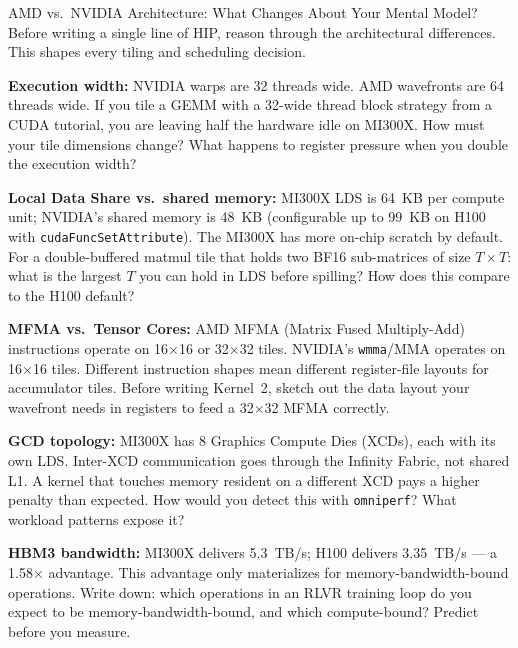 \begin{thinkfirst}{AMD vs.\ NVIDIA Architecture: What Changes About Your Mental Model?}
Before writing a single line of HIP, reason through the architectural differences. This shapes every tiling and scheduling decision.

\textbf{Execution width:} NVIDIA warps are 32 threads wide. AMD wavefronts are 64 threads wide. If you tile a GEMM with a 32-wide thread block strategy from a CUDA tutorial, you are leaving half the hardware idle on MI300X. How must your tile dimensions change? What happens to register pressure when you double the execution width?

\textbf{Local Data Share vs.\ shared memory:} MI300X LDS is 64~KB per compute unit; NVIDIA's shared memory is 48~KB (configurable up to 99~KB on H100 with \texttt{cudaFuncSetAttribute}). The MI300X has more on-chip scratch by default. For a double-buffered matmul tile that holds two BF16 sub-matrices of size $T \times T$: what is the largest $T$ you can hold in LDS before spilling? How does this compare to the H100 default?

\textbf{MFMA vs.\ Tensor Cores:} AMD MFMA (Matrix Fused Multiply-Add) instructions operate on 16$\times$16 or 32$\times$32 tiles. NVIDIA's \texttt{wmma}/MMA operates on 16$\times$16 tiles. Different instruction shapes mean different register-file layouts for accumulator tiles. Before writing Kernel~2, sketch out the data layout your wavefront needs in registers to feed a 32$\times$32 MFMA correctly.

\textbf{GCD topology:} MI300X has 8 Graphics Compute Dies (XCDs), each with its own LDS. Inter-XCD communication goes through the Infinity Fabric, not shared L1. A kernel that touches memory resident on a different XCD pays a higher penalty than expected. How would you detect this with \texttt{omniperf}? What workload patterns expose it?

\textbf{HBM3 bandwidth:} MI300X delivers 5.3~TB/s; H100 delivers 3.35~TB/s --- a 1.58$\times$ advantage. This advantage only materializes for memory-bandwidth-bound operations. Write down: which operations in an RLVR training loop do you expect to be memory-bandwidth-bound, and which compute-bound? Predict before you measure.
\end{thinkfirst}

